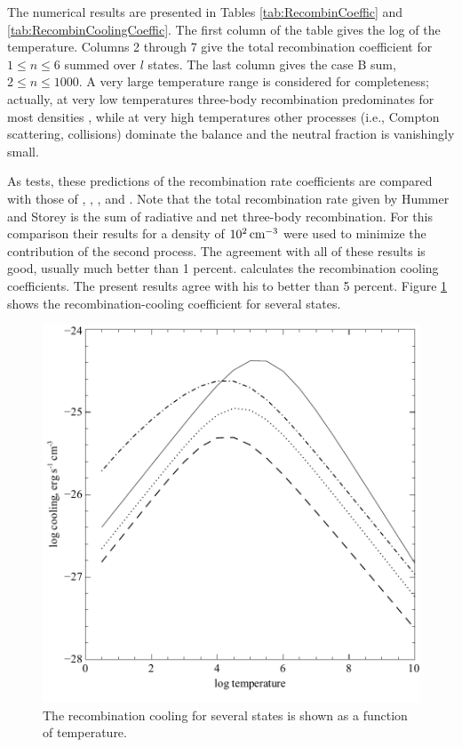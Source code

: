 The numerical results are presented in Tables \ref{tab:RecombinCoeffic}
and \ref{tab:RecombinCoolingCoeffic}.
The first column
of the table gives the log of the temperature.  Columns 2 through 7 give
the total recombination coefficient for $1 \le n \le 6$ summed over $l$ states. The
last column gives the case B sum, $2\le  n\le  1000$.  A very large temperature
range is considered for completeness; actually, at very low temperatures
three-body recombination predominates for most densities
\citep{Bates1962},
while at very high temperatures other processes (i.e., Compton scattering,
collisions) dominate the balance and the neutral fraction is vanishingly
small.

As tests, these predictions of the recombination rate coefficients are
compared with those of \citep{Seaton1959a},
\citep{Ferland1980c}, \citep{Hummer1987}, and \citet{Martin1988}.
Note that the total recombination rate given
by Hummer and Storey is the sum of radiative and net three-body
recombination.  For this comparison their results for a density of
$10^2 {\rm\thinspace cm^{-3}}$
were used to minimize the contribution of the second process.  The agreement
with all of these results is good, usually much better than 1 percent.
\citep{Seaton1959a} calculates the recombination cooling coefficients.
The present
results agree with his to better than 5 percent.
Figure \ref{fig:HRecomCooling} shows the recombination-cooling coefficient for several states.

\begin{figure}
\label{fig:HRecomCooling}
\centering
\includegraphics[scale=0.8]{HRecomCooling}
\caption[H recombination cooling]{The recombination cooling for several states is shown as a function
of temperature.}
\end{figure}

